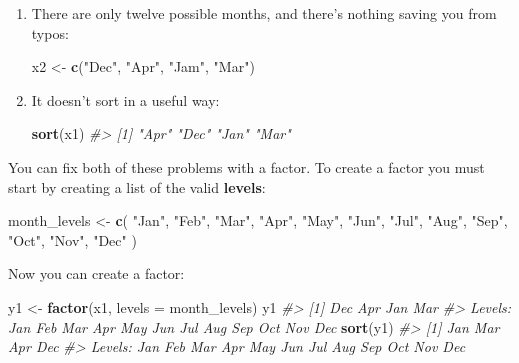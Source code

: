\documentclass[]{book}
\newenvironment{Shaded}{\begin{snugshade}}{\end{snugshade}}
\newcommand{\KeywordTok}[1]{\textcolor[rgb]{0.13,0.29,0.53}{\textbf{{#1}}}}
\newcommand{\DataTypeTok}[1]{\textcolor[rgb]{0.13,0.29,0.53}{{#1}}}
\newcommand{\StringTok}[1]{\textcolor[rgb]{0.31,0.60,0.02}{{#1}}}
\newcommand{\CommentTok}[1]{\textcolor[rgb]{0.56,0.35,0.01}{\textit{{#1}}}}
\newcommand{\NormalTok}[1]{{#1}}
\begin{document}
\begin{enumerate}
\def\labelenumi{\arabic{enumi}.}
\item
  There are only twelve possible months, and there's nothing saving you
  from typos:

\begin{Shaded}
\begin{Highlighting}[]
\NormalTok{x2 <-}\StringTok{ }\KeywordTok{c}\NormalTok{(}\StringTok{"Dec"}\NormalTok{, }\StringTok{"Apr"}\NormalTok{, }\StringTok{"Jam"}\NormalTok{, }\StringTok{"Mar"}\NormalTok{)}
\end{Highlighting}
\end{Shaded}
\item
  It doesn't sort in a useful way:

\begin{Shaded}
\begin{Highlighting}[]
\KeywordTok{sort}\NormalTok{(x1)}
\CommentTok{#> [1] "Apr" "Dec" "Jan" "Mar"}
\end{Highlighting}
\end{Shaded}
\end{enumerate}

You can fix both of these problems with a factor. To create a factor you
must start by creating a list of the valid \textbf{levels}:

\begin{Shaded}
\begin{Highlighting}[]
\NormalTok{month_levels <-}\StringTok{ }\KeywordTok{c}\NormalTok{(}
  \StringTok{"Jan"}\NormalTok{, }\StringTok{"Feb"}\NormalTok{, }\StringTok{"Mar"}\NormalTok{, }\StringTok{"Apr"}\NormalTok{, }\StringTok{"May"}\NormalTok{, }\StringTok{"Jun"}\NormalTok{, }
  \StringTok{"Jul"}\NormalTok{, }\StringTok{"Aug"}\NormalTok{, }\StringTok{"Sep"}\NormalTok{, }\StringTok{"Oct"}\NormalTok{, }\StringTok{"Nov"}\NormalTok{, }\StringTok{"Dec"}
\NormalTok{)}
\end{Highlighting}
\end{Shaded}

Now you can create a factor:

\begin{Shaded}
\begin{Highlighting}[]
\NormalTok{y1 <-}\StringTok{ }\KeywordTok{factor}\NormalTok{(x1, }\DataTypeTok{levels =} \NormalTok{month_levels)}
\NormalTok{y1}
\CommentTok{#> [1] Dec Apr Jan Mar}
\CommentTok{#> Levels: Jan Feb Mar Apr May Jun Jul Aug Sep Oct Nov Dec}
\KeywordTok{sort}\NormalTok{(y1)}
\CommentTok{#> [1] Jan Mar Apr Dec}
\CommentTok{#> Levels: Jan Feb Mar Apr May Jun Jul Aug Sep Oct Nov Dec}
\end{Highlighting}
\end{Shaded}
\end{document}
